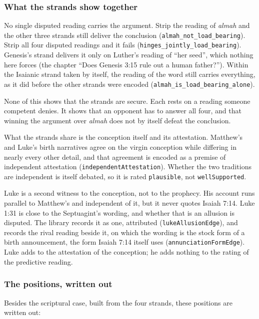\documentclass[11pt]{article}
\begin{document}
\subsubsection*{What the strands show together}
No single disputed reading carries the argument. Strip the reading of \emph{almah} and the other three strands still deliver the conclusion (\texttt{almah\_\allowbreak{}not\_\allowbreak{}load\_\allowbreak{}bearing}). Strip all four disputed readings and it fails (\texttt{hinges\_\allowbreak{}jointly\_\allowbreak{}load\_\allowbreak{}bearing}). Genesis’s strand delivers it only on Luther’s reading of “her seed”, which nothing here forces (the chapter “Does Genesis 3:15 rule out a human father?”). Within the Isaianic strand taken by itself, the reading of the word still carries everything, as it did before the other strands were encoded (\texttt{almah\_\allowbreak{}is\_\allowbreak{}load\_\allowbreak{}bearing\_\allowbreak{}alone}).

None of this shows that the strands are secure. Each rests on a reading someone competent denies. It shows that an opponent has to answer all four, and that winning the argument over \emph{almah} does not by itself defeat the conclusion.

What the strands share is the conception itself and its attestation. Matthew’s and Luke’s birth narratives agree on the virgin conception while differing in nearly every other detail, and that agreement is encoded as a premise of independent attestation (\texttt{independent\allowbreak{}Attestation}). Whether the two traditions are independent is itself debated, so it is rated \texttt{plausible}, not \texttt{well\allowbreak{}Supported}.

Luke is a second witness to the conception, not to the prophecy. His account runs parallel to Matthew’s and independent of it, but it never quotes Isaiah 7:14. Luke 1:31 is close to the Septuagint’s wording, and whether that is an allusion is disputed. The library records it as one, attributed (\texttt{luke\allowbreak{}Allusion\allowbreak{}Edge}), and records the rival reading beside it, on which the wording is the stock form of a birth announcement, the form Isaiah 7:14 itself uses (\texttt{annunciation\allowbreak{}Form\allowbreak{}Edge}). Luke adds to the attestation of the conception; he adds nothing to the rating of the predictive reading.

\subsubsection*{The positions, written out}
Besides the scriptural case, built from the four strands, these positions are written out:
\end{document}

